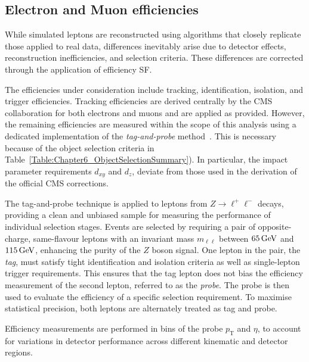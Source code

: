 \subsection{Electron and Muon efficiencies}

While simulated leptons are reconstructed using algorithms that closely replicate those applied to real data, differences inevitably arise due to detector effects, reconstruction inefficiencies, and selection criteria. These differences are corrected through the application of efficiency \ac{SF}.

The efficiencies under consideration include tracking, identification, isolation, and trigger efficiencies. Tracking efficiencies are derived centrally by the CMS collaboration for both electrons and muons and are applied as provided. However, the remaining efficiencies are measured within the scope of this analysis using a dedicated implementation of the \textit{tag-and-probe} method~\cite{CMS_Muon_System_Performance,CMS_Muon_System_Performance_2}. This is necessary because of the object selection criteria in Table~\ref{Table:Chapter6_ObjectSelectionSummary}). In particular, the impact parameter requirements $d_{xy}$ and $d_z$, deviate from those used in the derivation of the official CMS corrections. 

The tag-and-probe technique is applied to leptons from $Z \rightarrow \ell^+\ell^-$ decays, providing a clean and unbiased sample for measuring the performance of individual selection stages. Events are selected by requiring a pair of opposite-charge, same-flavour leptons with an invariant mass $m_{\ell\ell}$ between $65\,\text{Ge\hspace{-.08em}V}$ and $115\,\text{Ge\hspace{-.08em}V}$, enhancing the purity of the $Z$ boson signal. One lepton in the pair, the \textit{tag}, must satisfy tight identification and isolation criteria as well as single-lepton trigger requirements. This ensures that the tag lepton does not bias the efficiency measurement of the second lepton, referred to as the \textit{probe}. The probe is then used to evaluate the efficiency of a specific selection requirement. To maximise statistical precision, both leptons are alternately treated as tag and probe. 

Efficiency measurements are performed in bins of the probe $p_{\mathrm{T}}$ and $\eta$, to account for variations in detector performance across different kinematic and detector regions. 

